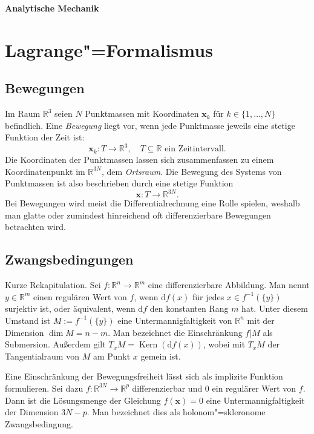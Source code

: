 \documentclass[a4paper,10pt,fleqn,twocolumn,twoside,dvipdfmx]{scrartcl}
\numberwithin{equation}{section}
\newcommand{\bv}[1]{\mathbf{#1}}
\newcommand{\R}{\mathbb R}
\begin{document}
\thispagestyle{empty}

\begin{huge}
\noindent
\textbf{Analytische Mechanik}
\par
\end{huge}
\vspace{1em}

\tableofcontents

\section{Lagrange"=Formalismus}

\subsection{Bewegungen}

Im Raum $\R^3$ seien $N$ Punktmassen mit Koordinaten
$\bv x_k$ für $k\in\{1,\ldots,N\}$ befindlich. Eine \emph{Bewegung}
liegt vor, wenn jede Punktmasse jeweils eine stetige Funktion der Zeit ist:%
\[\bv x_k\colon T\to\R^3, \quad\text{$T\subseteq\R$ ein Zeitintervall}.\]
Die Koordinaten der Punktmassen lassen sich zusammenfassen zu einem
Koordinatenpunkt im $\R^{3N}$, dem \emph{Ortsraum}. Die Bewegung des
Systems von Punktmassen ist also beschrieben durch eine stetige
Funktion
\[\bv x\colon T\to\R^{3N}.\]
Bei Bewegungen wird meist die Differentialrechnung eine Rolle spielen,
weshalb man glatte oder zumindest hinreichend oft differenzierbare
Bewegungen betrachten wird.

\subsection{Zwangsbedingungen}

Kurze Rekapitulation. Sei $f\colon\R^n\to\R^m$ eine differenzierbare
Abbildung. Man nennt $y\in\R^m$ einen regulären Wert von $f$, wenn
$\mathrm df(x)$ für jedes $x\in f^{-1}(\{y\})$ surjektiv ist, oder
äquivalent, wenn $\mathrm df$ den konstanten Rang $m$ hat.
Unter diesem Umstand ist $M:=f^{-1}(\{y\})$ eine Untermannigfaltigkeit
von $\R^n$ mit der Dimension $\dim M = n-m$. Man bezeichnet die
Einschränkung $f|M$ als Submersion. Außerdem gilt
$T_x M = \operatorname{Kern}(\mathrm df(x))$, wobei mit $T_x M$
der Tangentialraum von $M$ am Punkt $x$ gemein ist.

Eine Einschränkung der Bewegungsfreiheit lässt sich
als implizite Funktion formulieren. Sei dazu $f\colon\R^{3N}\to\R^p$
differenzierbar und 0 ein regulärer Wert von $f$. Dann ist die Lösungsmenge
der Gleichung $f(\bv x)=0$ eine Untermannigfaltigkeit der Dimension
$3N-p$. Man bezeichnet dies als holonom"=skleronome Zwangsbedingung.
\end{document}
